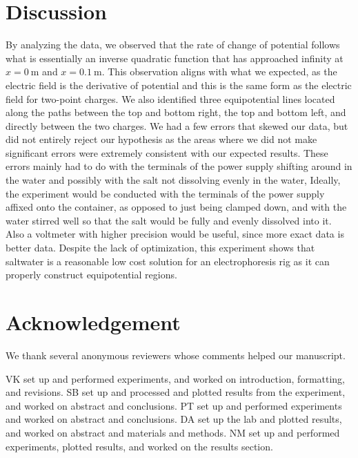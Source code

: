 ﻿\documentclass[10pt,journal,twoside]{IEEEtran}
\begin{document}
\section{Discussion}
By analyzing the data, we observed that the rate of change of potential follows what is essentially an inverse quadratic function that has approached infinity at $x=\qty{0}{\meter}$ and $x=\qty{0.1}{\meter}$. This observation aligns with what we expected, as the electric field is the derivative of potential and this is the same form as the electric field for two-point charges. We also identified three equipotential lines located along the paths between the top and bottom right, the top and bottom left, and directly between the two charges. We had a few errors that skewed our data, but did not entirely reject our hypothesis as the areas where we did not make significant errors were extremely consistent with our expected results. These errors mainly had to do with the terminals of the power supply shifting around in the water and possibly with the salt not dissolving evenly in the water, Ideally, the experiment would be conducted with the terminals of the power supply affixed onto the container, as opposed to just being clamped down, and with the water stirred well so that the salt would be fully and evenly dissolved into it. Also a voltmeter with higher precision would be useful, since more exact data is better data. Despite the lack of optimization, this experiment shows that saltwater is a reasonable low cost solution for an electrophoresis rig as it can properly construct equipotential regions.






\section{Acknowledgement}
We thank several anonymous reviewers whose comments helped our manuscript.  

VK set up and performed experiments, and worked on introduction, formatting, and revisions. SB set up and processed and plotted results from the experiment, and worked on abstract and conclusions. PT set up and performed experiments and worked on abstract and conclusions. DA set up the lab and plotted results, and worked on abstract and materials and methods. NM set up and performed experiments, plotted results, and worked on the results section. 

\end{document}
